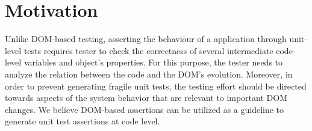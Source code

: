 \section{Motivation} \label{Sec:motivation}
Unlike DOM-based testing, asserting the behaviour of a \javascript application through unit-level tests requires tester to check the correctness of several intermediate code-level variables and object's properties. For this purpose, the tester needs to analyze the relation between the \javascript code and the DOM's evolution. Moreover, in order to prevent generating fragile unit tests, the testing effort should be directed towards aspects of the system behavior that are relevant to important DOM changes. We believe DOM-based assertions can be utilized as a guideline to generate unit test assertions at \javascript code level. 

